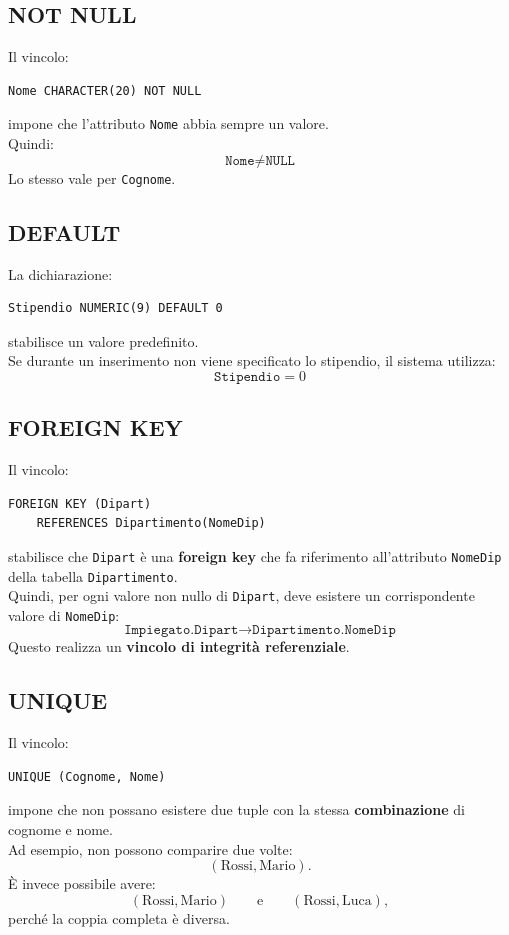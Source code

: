 \subsection{NOT NULL}
Il vincolo:
\begin{verbatim}
Nome CHARACTER(20) NOT NULL
\end{verbatim}
\noindent impone che l'attributo \texttt{Nome} abbia sempre un valore.\\
Quindi:
\[
\boxed{
\texttt{Nome} \neq \texttt{NULL}
}
\]
Lo stesso vale per \texttt{Cognome}.

\subsection{DEFAULT}
La dichiarazione:
\begin{verbatim}
Stipendio NUMERIC(9) DEFAULT 0
\end{verbatim}
\noindent stabilisce un valore predefinito.\\
Se durante un inserimento non viene specificato lo stipendio,
il sistema utilizza:
\[
\boxed{\texttt{Stipendio} = 0}
\]

\subsection{FOREIGN KEY}
Il vincolo:
\begin{verbatim}
FOREIGN KEY (Dipart)
    REFERENCES Dipartimento(NomeDip)
\end{verbatim}
\noindent stabilisce che \texttt{Dipart} è una \textbf{foreign key} che fa
riferimento all'attributo \texttt{NomeDip} della tabella
\texttt{Dipartimento}.\\
Quindi, per ogni valore non nullo di \texttt{Dipart}, deve esistere
un corrispondente valore di \texttt{NomeDip}:
\[
\boxed{
\texttt{Impiegato.Dipart}
\longrightarrow
\texttt{Dipartimento.NomeDip}
}
\]
Questo realizza un \textbf{vincolo di integrità referenziale}.

\subsection{UNIQUE}
Il vincolo:
\begin{verbatim}
UNIQUE (Cognome, Nome)
\end{verbatim}
\noindent impone che non possano esistere due tuple con la stessa
\textbf{combinazione} di cognome e nome.\\
Ad esempio, non possono comparire due volte:
\[
(\text{Rossi},\text{Mario}).
\]
È invece possibile avere:
\[
(\text{Rossi},\text{Mario})
\qquad\text{e}\qquad
(\text{Rossi},\text{Luca}),
\]
perché la coppia completa è diversa.

